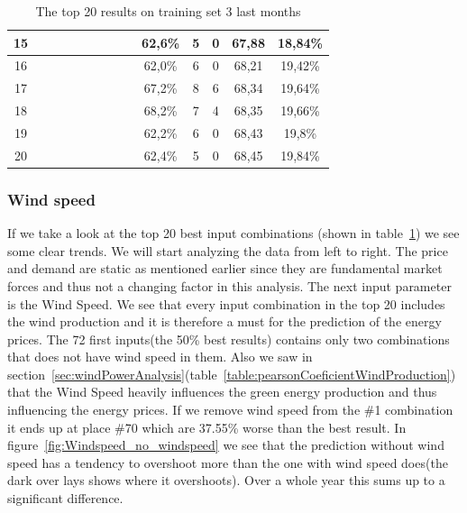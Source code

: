\begin{table}[H]
{\begin{tabular}{|c|c|c|c|c|c|c|c|c|c|c|c|c|c|}
15 &  \x    & \x    & \x    & \x    & \x    & \x    &       &       & 62,6\% &  5  & 0  & 67,88 & 18,84\% \\ \hline
16 &  \x    & \x    & \x    &       & \x    & \x    &       & \x    & 62,0\% &  6  & 0  & 68,21 & 19,42\% \\ \hline
17 &  \x    & \x    & \x    &       & \x\m  & \x\m  &       &       & 67,2\% &  8  & 6  & 68,34 & 19,64\% \\ \hline
18 &  \x    & \x    & \x    &       & \x\m  &       &       & \x\m  & 68,2\% &  7  & 4  & 68,35 & 19,66\% \\ \hline
19 &  \x    & \x    & \x    & \x    & \x    & \x    & \x    &       & 62,2\% &  6  & 0  & 68,43 & 19,8\% \\ \hline
20 &  \x    & \x    & \x    & \x    & \x    &       &       & \x\m  & 62,4\% &  5  & 0  & 68,45 & 19,84\% \\ \hline
\end{tabular}
}
\caption{The top 20 results on training set 3 last months} %
\label{table:Top20Prices} %
\end{table}

\subsubsection{Wind speed}
If we take a look at the top 20 best input combinations (shown in table~\ref{table:Top20Prices}) we see some clear trends. We will start analyzing the data from left to right. The price and demand are static as mentioned earlier since they are fundamental market forces and thus not a changing factor in this analysis. The next input parameter is the Wind Speed. We see that every input combination in the top 20 includes the wind production and it is therefore a must for the prediction of the energy prices. The 72 first inputs(the 50\% best results) contains only two combinations that does not have wind speed in them. Also we saw in section~\ref{sec:windPowerAnalysis}(table~\ref{table:pearsonCoeficientWindProduction}) that the Wind Speed heavily influences the green energy production and thus influencing the energy prices. If we remove wind speed from the \#1 combination it ends up at place \#70 which are 37.55\% worse than the best result. In figure~\ref{fig:Windspeed_no_windspeed} we see that the prediction without wind speed has a tendency to overshoot more than the one with wind speed does(the dark over lays shows where it overshoots). Over a whole year this sums up to a significant difference.

